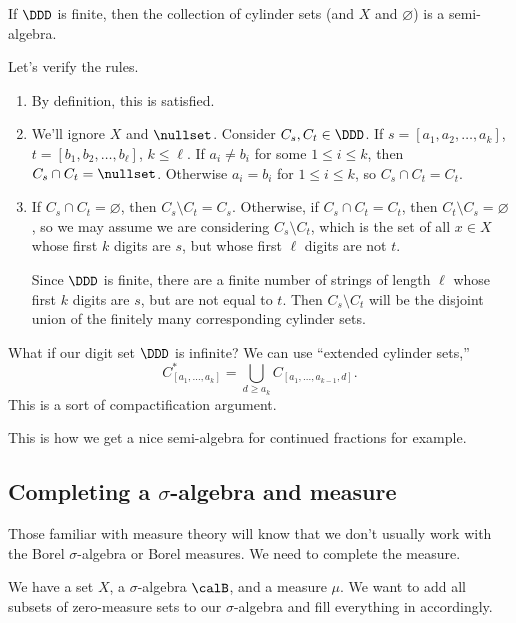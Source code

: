 \documentclass{article}
\begin{document}
\begin{example}
    If $\DDD$ is finite, then the collection
    of cylinder sets (and $X$ and $\varnothing$)
    is a semi-algebra.

    Let's verify the rules.
    \begin{enumerate}
        \item By definition, this is satisfied.
        \item We'll ignore $X$ and $\nullset$.
            Consider $C_s,C_t\in \DDD$.
            If $s=[a_1,a_2,\ldots, a_k]$, 
            $t=[b_1,b_2,\ldots,b_\ell]$, $k\le \ell$.
            If $a_i\ne b_i$ for some $1\le i \le k$, then
            $C_s\cap C_t = \nullset$. Otherwise
            $a_i=b_i$ for $1\le i\le k$, so $C_s\cap C_t=C_t$.
        \item If $C_s\cap C_t = \varnothing$,
        then $C_s \setminus C_t = C_s$. Otherwise,
        if $C_s\cap C_t = C_t$, 
        then $C_t\setminus C_s = \varnothing$, so we may assume we
        are considering $C_s\setminus C_t$, which is the set of all
        $x\in X$ whose first $k$ digits are $s$, but whose
        first $\ell$ digits are not $t$.

        Since $\DDD$ is finite, there are a finite number of strings
        of length $\ell$ whose first $k$ digits are $s$, but are 
        not equal to $t$. Then $C_s\setminus C_t$ will be the 
        disjoint union of the finitely many corresponding 
        cylinder sets.
    \end{enumerate}

    What if our digit set $\DDD$ is infinite?
    We can use ``extended cylinder sets,'' 
    \[ C^*_{[a_1,\ldots,a_k]} =
    \bigcup_{d\ge a_k} C_{[a_1,\ldots,a_{k-1},d]}.\]
    This is a sort of compactification argument.

    This is how we get a nice semi-algebra for continued 
    fractions for example.
\end{example}

\subsection{Completing a $\sigma$-algebra and measure}

Those familiar with measure theory will know that we don't usually
work with the Borel $\sigma$-algebra or Borel measures. We need
to complete the measure.

We have a set $X$, a $\sigma$-algebra $\calB$, and a measure $\mu$.
We want to add all subsets of zero-measure sets to our 
$\sigma$-algebra and fill everything in accordingly.
\end{document}

